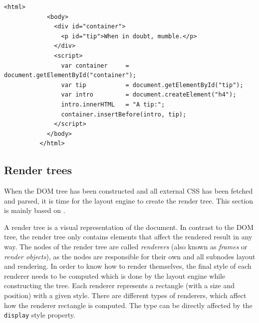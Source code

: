 \documentclass[a4paper,11pt]{kth-mag}
\newcommand{\code}[1]{\texttt{#1}}
\begin{document}
        \begin{lstlisting}[gobble=10,caption={Simple example of reentrant HTML. The layout engine needs to reconstruct the \gls{DOM} tree after executing the JavaScript. The page will not be rendered until all JavaScript has been executed.}, captionpos=b, label={code:reentrant-html}]
          <html>
            <body>
              <div id="container">
                <p id="tip">When in doubt, mumble.</p>
              </div>
              <script>
                var container     = document.getElementById("container");
                var tip           = document.getElementById("tip");
                var intro         = document.createElement("h4");
                intro.innerHTML   = "A tip:";
                container.insertBefore(intro, tip);
              </script>
            </body>
          </html>
        \end{lstlisting}


      \subsection{Render trees}\label{sec:render-tree}
        When the \gls{DOM} tree has been constructed and all external \gls{CSS} has been fetched and parsed, it is time for the \gls{layout engine} to create the \gls{render tree}.
        This section is mainly based on .

        A \gls{render tree} is a visual representation of the \gls{document}.
        In contrast to the \gls{DOM} tree, the \gls{render tree} only contains \glspl{element} that affect the rendered result in any way.
        The nodes of the \gls{render tree} are called \emph{renderers} (also known as \emph{frames} or \emph{render objects}), as the nodes are responsible for their own and all subnodes layout and rendering.
        In order to know how to render themselves, the final style of each renderer needs to be computed which is done by the \gls{layout engine} while constructing the tree.
        Each renderer represents a rectangle (with a size and position) with a given style.
        There are different types of renderers, which affect how the renderer rectangle is computed.
        The type can be directly affected by the \code{display} style property.
\end{document}
